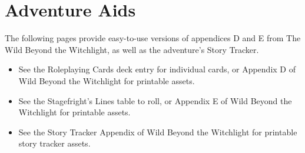 \documentclass[10pt,a4paper,twoside,twocolumn,openany,nodeprecatedcode,bg=print]{dndbook}
\begin{document}
\chapter{Adventure Aids}
The following pages provide easy-to-use versions of appendices D and E from The Wild Beyond the Witchlight, as well as the adventure's Story Tracker.
\begin{itemize}

\item See the Roleplaying Cards deck entry for individual cards, or Appendix D of Wild Beyond the Witchlight for printable assets.
\item See the Stagefright's Lines table to roll, or Appendix E of Wild Beyond the Witchlight for printable assets.
\item See the Story Tracker Appendix of Wild Beyond the Witchlight for printable story tracker assets.
\end{itemize}
\end{document}
